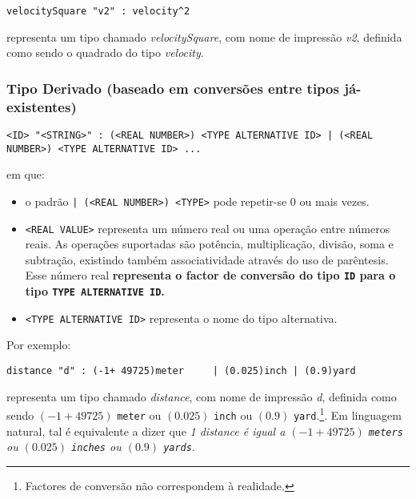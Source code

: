 \documentclass{report}
\begin{document}
\begin{lstlisting}
velocitySquare "v2" : velocity^2
\end{lstlisting}
representa um tipo chamado \textit{velocitySquare}, com nome de impressão \textit{v2}, definida como sendo o quadrado do tipo \textit{velocity}.

\subsubsection{Tipo Derivado (baseado em conversões entre tipos já-existentes)}
\label{chap.documentacao.derivedTypeOr}
\begin{lstlisting}[caption= Linguagem de Definição de Tipos - Instrução de definição de tipo derivado (baseado em conversões entre tipos já-existentes)]
<ID> "<STRING>" : (<REAL NUMBER>) <TYPE ALTERNATIVE ID> | (<REAL NUMBER>) <TYPE ALTERNATIVE ID> ...
\end{lstlisting}

em que:
\begin{itemize}
    \item o padrão \texttt{| (<REAL NUMBER>) <TYPE>} pode repetir-se 0 ou mais vezes.
    \item \texttt{<REAL VALUE>} representa um número real ou uma operação entre números reais. As operações suportadas são potência, multiplicação, divisão, soma e subtração, existindo também associatividade através do uso de parêntesis. Esse número real \textbf{representa o factor de conversão do tipo \texttt{ID} para o tipo \texttt{TYPE ALTERNATIVE ID}.}
    \item \texttt{<TYPE ALTERNATIVE ID>} representa o nome do tipo alternativa.
\end{itemize}
\noindent
Por exemplo:
\begin{lstlisting}
distance "d" : (-1+ 49725)meter 	| (0.025)inch | (0.9)yard
\end{lstlisting}
representa um tipo chamado \textit{distance}, com nome de impressão \textit{d}, definida como sendo $(-1+ 49725)$ \texttt{meter} ou $(0.025)$ \texttt{inch} ou $(0.9)$ \texttt{yard}.\footnote{Factores de conversão não correspondem à realidade.}. Em linguagem natural, tal é equivalente a dizer que \textit{1 distance é igual a $(-1+ 49725)$ \texttt{meters} ou $(0.025)$ \texttt{inches} ou $(0.9)$ \texttt{yards}}.

\end{document}

